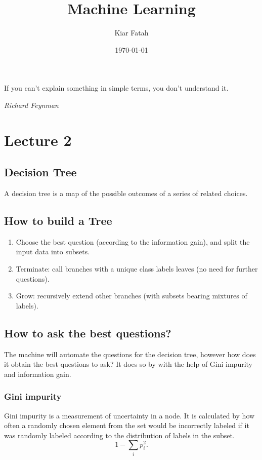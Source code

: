 \documentclass[12pt]{article}
\title{Machine Learning}
\author{Kiar Fatah}
\date{\today}
\numberwithin{equation}{section}
\begin{document}
\maketitle

\newpage

\tableofcontents 

\newpage
\epigraph{If you can’t explain something in simple terms, you don’t understand it.}{\textit{Richard Feynman }}
\newpage

\section{Lecture 2}
\subsection{Decision Tree}
A decision tree is a map of the possible outcomes of a series of related choices.
\subsection{How to build a Tree}
\begin{enumerate}
\item Choose the best question (according to the information
gain), and split the input data into subsets.
\item Terminate: call branches with a unique class labels leaves
(no need for further questions).
\item Grow: recursively extend other branches (with subsets bearing mixtures of labels).
\end{enumerate}

\subsection{How to ask the best questions?}
The machine will automate the questions for the decision tree, however how does it obtain the best questions to ask? It does so by with the help of Gini impurity and information gain.
\subsubsection{Gini impurity}
Gini impurity is a measurement of uncertainty in a node. It is calculated by how often a randomly chosen element from the set would be incorrectly labeled if it was randomly labeled according to the distribution of labels in the subset. 
\begin{equation}
    1 - \sum_i p_i^2.
\end{equation}
\end{document}
